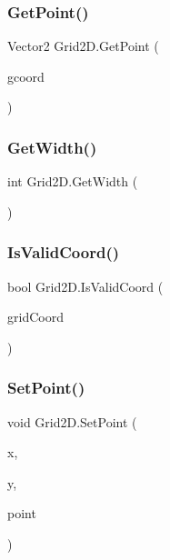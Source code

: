 \mbox{\label{struct_grid2_d_a5b34f0d8b83f9fa7148f42030efb7182}} 
\subsubsection{\texorpdfstring{Get\+Point()}{GetPoint()}\hspace{0.1cm}{\footnotesize\ttfamily [2/2]}}
{\footnotesize\ttfamily Vector2 Grid2\+D.\+Get\+Point (\begin{DoxyParamCaption}\item[{\mbox{\hyperlink{struct_int_point}{Int\+Point}}}]{gcoord }\end{DoxyParamCaption})}

\mbox{\label{struct_grid2_d_a87f97756b42b798f0fb888407a42db7c}} 
\subsubsection{\texorpdfstring{Get\+Width()}{GetWidth()}}
{\footnotesize\ttfamily int Grid2\+D.\+Get\+Width (\begin{DoxyParamCaption}{ }\end{DoxyParamCaption})}

\mbox{\label{struct_grid2_d_a5bab1dc86bbc11873dbea422b83c01e2}} 
\subsubsection{\texorpdfstring{Is\+Valid\+Coord()}{IsValidCoord()}}
{\footnotesize\ttfamily bool Grid2\+D.\+Is\+Valid\+Coord (\begin{DoxyParamCaption}\item[{\mbox{\hyperlink{struct_int_point}{Int\+Point}}}]{grid\+Coord }\end{DoxyParamCaption})}

\mbox{\label{struct_grid2_d_aef80a8514e645da44457a6a2e2bb4823}} 
\subsubsection{\texorpdfstring{Set\+Point()}{SetPoint()}\hspace{0.1cm}{\footnotesize\ttfamily [1/2]}}
{\footnotesize\ttfamily void Grid2\+D.\+Set\+Point (\begin{DoxyParamCaption}\item[{int}]{x,  }\item[{int}]{y,  }\item[{Vector2}]{point }\end{DoxyParamCaption})}

